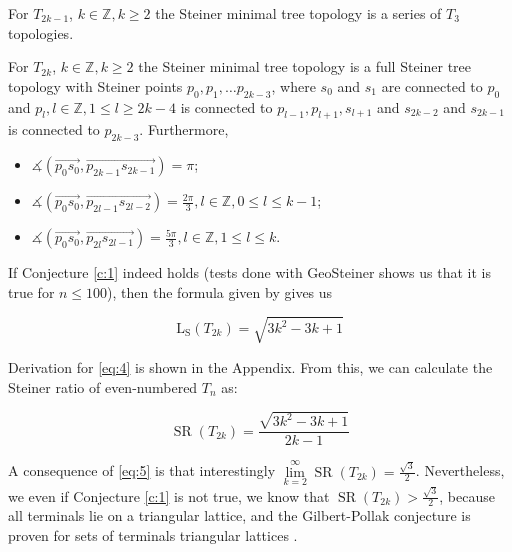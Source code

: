 \documentclass{mpaper}
\begin{document}
\begin{conjecture}\label{c:1}
  For $T_{2k-1}$, $k\in\mathbb{Z}, k\geq 2$ the Steiner minimal tree topology is a series of $T_3$ topologies.

  For $T_{2k}$, $k\in\mathbb{Z}, k\geq 2$ the Steiner minimal tree topology is a full Steiner tree topology with Steiner points $p_0,\allowbreak p_1,\allowbreak \dots p_{2k-3}$, where $s_0$ and $s_1$ are connected to $p_0$ and $p_l, l\in\mathbb{Z}, 1\leq l\geq 2k-4$ is connected to $p_{l-1}, p_{l+1}, s_{l+1}$ and  $s_{2k-2}$ and $s_{2k-1}$ is connected to  $p_{2k-3}$. Furthermore,

    \begin{itemize}
    \item $\measuredangle(\overrightarrow{p_0s_0}, \overrightarrow{p_{2k-1}s_{2k-1}})=\pi$;
    \item $\measuredangle(\overrightarrow{p_0s_0}, \overrightarrow{p_{2l-1}s_{2l-2}})=\frac{2\pi}{3}, l\in\mathbb{Z}, 0\leq l\leq k-1$;
    \item $\measuredangle(\overrightarrow{p_0s_0}, \overrightarrow{p_{2l}s_{2l-1}})=\frac{5\pi}{3}, l\in\mathbb{Z}, 1\leq l\leq k$.
  \end{itemize}
\end{conjecture}

If Conjecture \ref{c:1} indeed holds (tests done with GeoSteiner shows us that it is true for $n\leq 100$), then the formula given by \cite{uteshev2021length} gives us

\begin{equation} \label{eq:4}
  \operatorname{L_S}(T_{2k}) = \sqrt{3k^2 -3k + 1}
\end{equation}

Derivation for \eqref{eq:4} is shown in the Appendix. From this, we can calculate the Steiner ratio of even-numbered $T_n$ as:

\begin{equation} \label{eq:5}
  \operatorname{SR}(T_{2k}) = \frac{\sqrt{3k^2 -3k + 1}}{2 k - 1}
\end{equation}

A consequence of \eqref{eq:5} is that interestingly $\allowbreak\lim\limits_{k=2}^\infty \allowbreak\operatorname{SR}(T_{2k})=\frac{\sqrt{3}}{2}$. Nevertheless, we even if Conjecture \ref{c:1} is not true, we know that $\operatorname{SR}(T_{2k})>\frac{\sqrt{3}}{2}$, because all terminals lie on a triangular lattice, and the Gilbert-Pollak conjecture is proven for sets of terminals triangular lattices \cite{po}.
\end{document}
